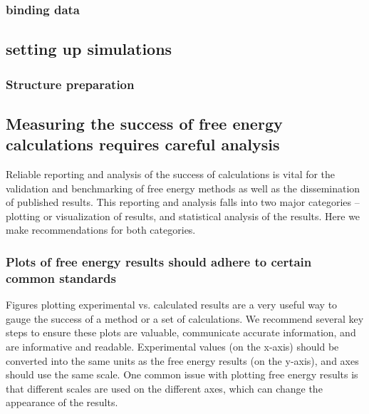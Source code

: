 \documentclass[9pt,bestpractices]{livecoms}
\begin{document}
\subsubsection{binding data}

\subsection{setting up simulations}

\subsubsection{Structure preparation}
\label{sec:prep}

\subsection{Measuring the success of free energy calculations requires careful analysis}
Reliable reporting and analysis of the success of calculations is vital for the validation and benchmarking of free energy methods as well as the dissemination of published results. This reporting and analysis falls into two major categories -- plotting or visualization of results, and statistical analysis of the results. Here we make recommendations for both categories.

\subsubsection{Plots of free energy results should adhere to certain common standards}
\label{sec:plotting_results}
Figures plotting experimental vs. calculated results are a very useful way to gauge the success of a method or a set of calculations. We recommend several key steps to ensure these plots are valuable, communicate accurate information, and are informative and readable. Experimental values (on the x-axis) should be converted into the same units as the free energy results (on the y-axis), and axes should use the same scale. One common issue with plotting free energy results is that different scales are used on the different axes, which can change the appearance of the results.
\end{document}
